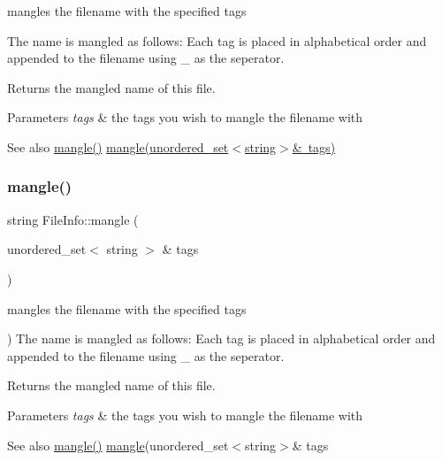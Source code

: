 mangles the filename with the specified tags 

The name is mangled as follows\+: Each tag is placed in alphabetical order and appended to the filename using \textquotesingle{}\+\_\+\textquotesingle{} as the seperator. \begin{DoxyReturn}{Returns}
the mangled name of this file. 
\end{DoxyReturn}

\begin{DoxyParams}{Parameters}
{\em tags} & the tags you wish to mangle the filename with \\
\hline
\end{DoxyParams}
\begin{DoxySeeAlso}{See also}
\mbox{\hyperlink{classFileInfo_a96827c2e48fb1a15d468e9afd545383e}{mangle()}} \mbox{\hyperlink{classFileInfo_aec8a60addbed54097f6cac0a6a516717}{mangle(unordered\+\_\+set$<$string$>$\& tags)}} 
\end{DoxySeeAlso}
\mbox{\label{classFileInfo_aec8a60addbed54097f6cac0a6a516717}} 
\subsubsection{\texorpdfstring{mangle()}{mangle()}\hspace{0.1cm}{\footnotesize\ttfamily [3/3]}}
{\footnotesize\ttfamily string File\+Info\+::mangle (\begin{DoxyParamCaption}\item[{unordered\+\_\+set$<$ string $>$ \&}]{tags }\end{DoxyParamCaption})}



mangles the filename with the specified tags 

) The name is mangled as follows\+: Each tag is placed in alphabetical order and appended to the filename using \textquotesingle{}\+\_\+\textquotesingle{} as the seperator.

\begin{DoxyReturn}{Returns}
the mangled name of this file. 
\end{DoxyReturn}

\begin{DoxyParams}{Parameters}
{\em tags} & the tags you wish to mangle the filename with \\
\hline
\end{DoxyParams}
\begin{DoxySeeAlso}{See also}
\mbox{\hyperlink{classFileInfo_a96827c2e48fb1a15d468e9afd545383e}{mangle()}} \mbox{\hyperlink{classFileInfo_a96827c2e48fb1a15d468e9afd545383e}{mangle}}(unordered\+\_\+set$<$string$>$\& tags 
\end{DoxySeeAlso}
\mbox{\label{classFileInfo_a2bf60d4be97347f3d7a15cf839afca7d}} 
